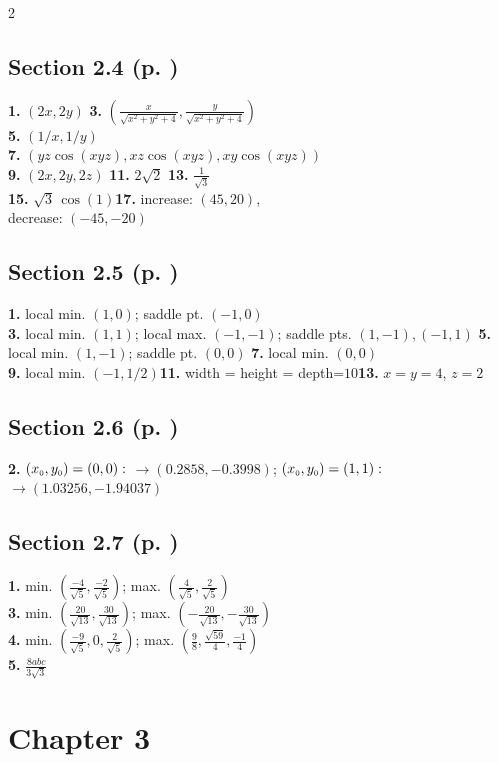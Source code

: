 \begin{multicols}{2}
\subsection*{Section 2.4 (p. \pageref{sec2dot4})}
\textbf{1.} $(2x,2y)$\quad
\textbf{3.} $(\frac{x}{\sqrt{x^2 + y^2 + 4}},\frac{y}{\sqrt{x^2 + y^2 + 4}})$\\
\textbf{5.} $(1/x,1/y)$\\
\textbf{7.} $(yz\cos(xyz),xz\cos(xyz),xy\cos(xyz))$\\
\textbf{9.} $(2x,2y,2z)$\quad
\textbf{11.} $2\sqrt{2}$\quad
\textbf{13.} $\frac{1}{\sqrt{3}}$\\
\textbf{15.} $\sqrt{3}\,\cos(1)$\quad\textbf{17.} increase: $(45,20)$,\\decrease: $(-45,-20)$
\subsection*{Section 2.5 (p. \pageref{sec2dot5})}
\textbf{1.} local min. $(1,0)$; saddle pt. $(-1,0)$\\\textbf{3.}
local min. $(1,1)$; local max. $(-1,-1)$; saddle pts. $(1,-1),(-1,1)$\quad
\textbf{5.} local min. $(1,-1)$; saddle pt. $(0,0)$\quad
\textbf{7.} local min. $(0,0)$\\\textbf{9.} local min. $(-1,1/2)$\quad\textbf{11.}
width = height = depth=$10$\quad\textbf{13.} $x=y=4$, $z=2$
\subsection*{Section 2.6 (p. \pageref{sec2dot6})}
\textbf{2.} $(x_{\scriptscriptstyle 0},y_{\scriptscriptstyle 0})=(0,0):$ $\rightarrow (0.2858,-0.3998)$;
$(x_{\scriptscriptstyle 0},y_{\scriptscriptstyle 0})=(1,1):$ $\rightarrow (1.03256,-1.94037)$
\subsection*{Section 2.7 (p. \pageref{sec2dot7})}
\textbf{1.} min. $\left(\frac{-4}{\sqrt{5}},\frac{-2}{\sqrt{5}}\right)$;
max. $\left(\frac{4}{\sqrt{5}},\frac{2}{\sqrt{5}}\right)$\\\textbf{3.}
min. $\left(\frac{20}{\sqrt{13}},\frac{30}{\sqrt{13}}\right)$;
max. $\left(-\frac{20}{\sqrt{13}},-\frac{30}{\sqrt{13}}\right)$\\\textbf{4.}
min. $\left(\frac{-9}{\sqrt{5}},0,\frac{2}{\sqrt{5}}\right)$;
max. $\left(\frac{9}{8},\frac{\sqrt{59}}{4},\frac{-1}{4}\right)$\\\textbf{5.} $\frac{8abc}{3\sqrt{3}}$
\section*{Chapter 3}

\end{multicols}
